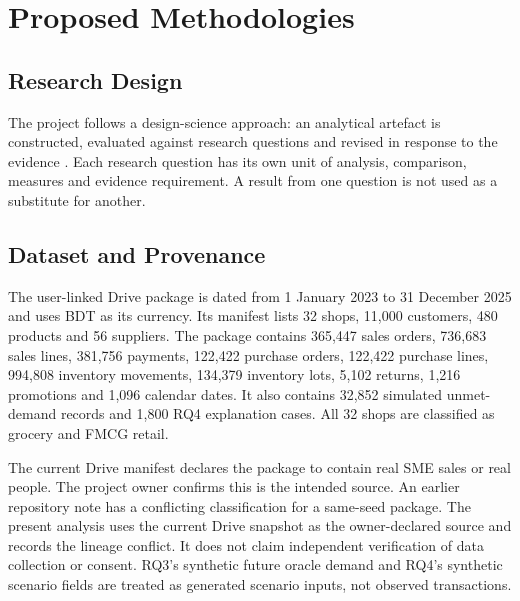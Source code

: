 \chapter{Proposed Methodologies}
\label{chapter_proposedMethod}

\section{Research Design}
The project follows a design-science approach: an analytical artefact is constructed, evaluated against research questions and revised in response to the evidence \citep{hevner2004design}. Each research question has its own unit of analysis, comparison, measures and evidence requirement. A result from one question is not used as a substitute for another.

\section{Dataset and Provenance}
The user-linked Drive package is dated from 1 January 2023 to 31 December 2025 and uses BDT as its currency. Its manifest lists 32 shops, 11,000 customers, 480 products and 56 suppliers. The package contains 365,447 sales orders, 736,683 sales lines, 381,756 payments, 122,422 purchase orders, 122,422 purchase lines, 994,808 inventory movements, 134,379 inventory lots, 5,102 returns, 1,216 promotions and 1,096 calendar dates. It also contains 32,852 simulated unmet-demand records and 1,800 RQ4 explanation cases. All 32 shops are classified as grocery and FMCG retail.

The current Drive manifest declares the package to contain real SME sales or real people. The project owner confirms this is the intended source. An earlier repository note has a conflicting classification for a same-seed package. The present analysis uses the current Drive snapshot as the owner-declared source and records the lineage conflict. It does not claim independent verification of data collection or consent. RQ3's synthetic future oracle demand and RQ4's synthetic scenario fields are treated as generated scenario inputs, not observed transactions.

